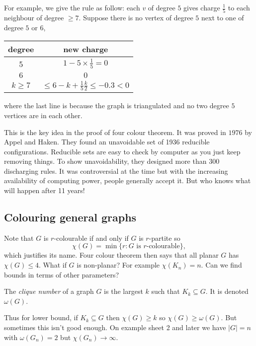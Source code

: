 \documentclass[a4paper]{article}
\begin{document}
For example, we give the rule as follow: each \(v\) of degree \(5\) gives charge \(\frac{1}{5}\) to each neighbour of degree \(\geq 7\). Suppose there is no vertex of degree \(5\) next to one of degree \(5\) or \(6\),
\begin{table}[h]
  \centering
  \begin{tabular}{|c|c|}
    \hline
    degree & new charge \\ \hline
    5 & \(1 - 5 \times \frac{1}{5} = 0\) \\ \hline
    \(6\) & \(0\) \\ \hline
    \(k \geq 7\) & \(\leq 6 - k + \frac{1}{5} \frac{k}{2} \leq -0.3 < 0\) \\ \hline
  \end{tabular}
\end{table}

where the last line is because the graph is triangulated and no two degree \(5\) vertices are in each other.

This is the key idea in the proof of four colour theorem. It was proved in \(1976\) by Appel and Haken. They found an unavoidable set of 1936 reducible configurations. Reducible sets are easy to check by computer as you just keep removing things. To show unavoidability, they designed more than 300 discharging rules. It was controversial at the time but with the increasing availability of computing power, people generally accept it. But who knows what will happen after 11 years!

\subsection{Colouring general graphs}

Note that \(G\) is \(r\)-colourable if and only if \(G\) is \(r\)-partite so
\[
  \chi(G) = \min\{r: G \text{ is \(r\)-colourable}\},
\]
which justifies its name. Four colour theorem then says that all planar \(G\) has \(\chi(G) \leq 4\). What if \(G\) is non-planar? For example \(\chi(K_n) = n\). Can we find bounds in terms of other parameters?

\begin{definition}
  The \emph{clique number} of a graph \(G\) is the largest \(k\) such that \(K_k \subseteq G\). It is denoted \(\omega(G)\).
\end{definition}

Thus for lower bound, if \(K_k \subseteq G\) then \(\chi(G) \geq k\) so \(\chi(G) \geq \omega(G)\). But sometimes this isn't good enough. On example sheet 2 and later we have \(|G| = n\) with \(\omega(G_n) = 2\) but \(\chi(G_n) \to \infty\).
\end{document}
